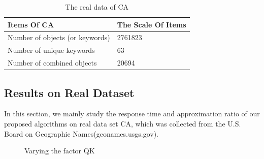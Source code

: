 \begin{table}[!hb]
\centering
\begin{tabular}{|l|l|}
\hline
Items Of CA & The Scale Of Items \\
\hline
Number of objects (or keywords) & 2761823 \\
\hline
Number of unique keywords & 63 \\
\hline
Number of combined objects & 20694 \\
\hline
\end{tabular}
\caption{The real data of CA}
\label{T5}
\end{table}

\subsection{Results on Real Dataset}
In this section, we mainly study the response time and approximation ratio of our proposed algorithms on real data set CA, which was collected from the U.S. Board on Geographic Names(geonames.usgs.gov).
\begin{figure} \centering
\caption{Varying the factor QK}
\label{F9}
\end{figure}

